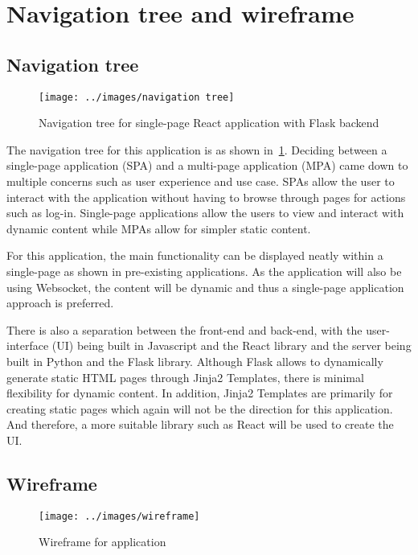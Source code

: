 \clearpage


\section{Navigation tree and wireframe}\label{sec:navigation-tree-and-wireframe}

\subsection{Navigation tree}\label{subsec:navigation-tree}

\begin{figure}[h]
    \centering
    \texttt{[image: ../images/navigation tree]}
    \caption{Navigation tree for single-page React application with Flask backend}
    \label{fig:navigationTree}
\end{figure}
The navigation tree for this application is as shown in~\ref{fig:navigationTree}.
Deciding between a single-page application (SPA) and a multi-page application (MPA) came down to multiple concerns such as user experience and use case.
SPAs allow the user to interact with the application without having to browse through pages for actions such as log-in.
Single-page applications allow the users to view and interact with dynamic content while MPAs allow for simpler static content.

For this application, the main functionality can be displayed neatly within a single-page as shown in pre-existing applications.
As the application will also be using Websocket, the content will be dynamic and thus a single-page application approach is preferred.

There is also a separation between the front-end and back-end, with the user-interface (UI) being built in Javascript and the React library and the server being built in Python and the Flask library.
Although Flask allows to dynamically generate static HTML pages through Jinja2 Templates, there is minimal flexibility for dynamic content.
In addition, Jinja2 Templates are primarily for creating static pages which again will not be the direction for this application.
And therefore, a more suitable library such as React will be used to create the UI.

\clearpage

\subsection{Wireframe}\label{subsec:wireframe}

\begin{figure}[h]
    \centering
    \texttt{[image: ../images/wireframe]}
    \caption{Wireframe for application}
    \label{fig:wireframe}
\end{figure}

